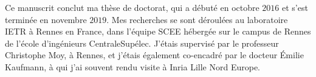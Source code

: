 \begin{resume_fr}



Ce manuscrit conclut ma thèse de doctorat, qui a débuté en octobre $2016$ et s'est terminée en novembre $2019$.
Mes recherches se sont déroulées au laboratoire IETR à Rennes en France, dans l'équipe SCEE hébergée sur le campus de Rennes de l'école d'ingénieurs CentraleSupélec.
J'étais supervisé par le professeur Christophe Moy, à Rennes,
et j'étais également co-encadré par le docteur Émilie Kaufmann, à qui j'ai souvent rendu visite à Inria Lille Nord Europe.





\end{resume_fr}
